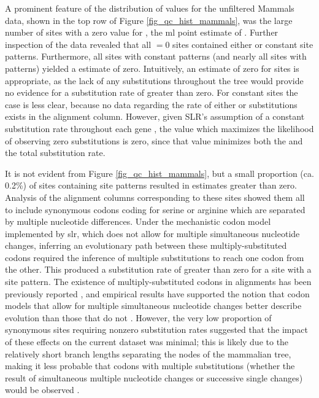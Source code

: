 A prominent feature of the distribution of \omg values for the
unfiltered Mammals data, shown in the top row of Figure
\ref{fig_qc_hist_mammals}, was the large number of sites with a
zero value for \omgml, the \ac{ml} point estimate of \omg. Further
inspection of the data revealed that all \omgml$=0$ sites contained
either \syn or constant site patterns. Furthermore, all sites with
constant patterns (and nearly all sites with \syn patterns) yielded a
\omgml estimate of zero. Intuitively, an estimate of zero for \syn
sites is appropriate, as the lack of any \nsyn substitutions
throughout the tree would provide no evidence for a \nsyn substitution
rate of greater than zero. For constant sites the case is less clear,
because no data regarding the rate of either \syn or \nsyn
substitutions exists in the alignment column. However, given SLR's
assumption of a constant \syn substitution rate throughout each gene
\citep{Massingham2005}, the \omg value which maximizes the likelihood
of observing zero substitutions is zero, since that value minimizes
both the \nsyn and the total substitution rate.

It is not evident from Figure \ref{fig_qc_hist_mammals}, but a small
proportion (ca. 0.2\%) of sites containing \syn site patterns resulted
in \ml estimates greater than zero. Analysis of the alignment columns
corresponding to these sites showed them all to include synonymous
codons coding for serine or arginine which are separated by multiple
nucleotide differences. Under the mechanistic codon model implemented
by \ac{slr}, which does not allow for multiple simultaneous nucleotide
changes, inferring an evolutionary path between these
multiply-substituted codons required the inference of multiple \nsyn
substitutions to reach one codon from the other. This produced a \nsyn
substitution rate of greater than zero for a site with a \syn site
pattern. The existence of multiply-substituted codons in alignments
has been previously reported \citep{Averof2000,Whelan2004}, and
empirical results have supported the notion that codon models that
allow for multiple simultaneous nucleotide changes better describe
evolution than those that do not \citep{Kosiol2007}. However, the very
low proportion of synonymous sites requiring nonzero \nsyn
substitution rates suggested that the impact of these effects on the
current dataset was minimal; this is likely due to the relatively
short branch lengths separating the nodes of the mammalian tree,
making it less probable that codons with multiple substitutions
(whether the result of simultaneous multiple nucleotide changes or
successive single changes) would be observed \citep{Kosiol2007}.

